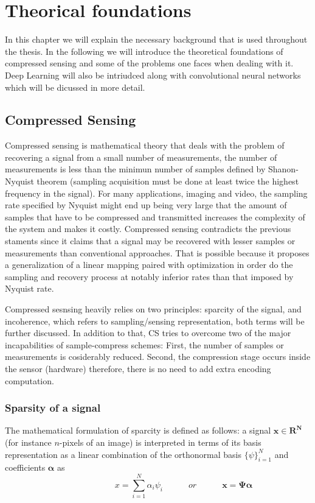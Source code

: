 \chapter{Theorical foundations}
In this chapter we will explain the necessary background that is used throughout the thesis. In the following we will introduce the theoretical foundations of compressed sensing and some of the problems one faces when dealing with it. Deep Learning will also be intriudced along with convolutional neural networks which will be dicussed in more detail.  

\section{Compressed Sensing}

Compressed sensing is mathematical theory that deals with the problem of recovering a signal from a small number of measurements, the number of measurements is less than the minimun number of samples defined by Shanon-Nyquist theorem (sampling acquisition must be done at least twice the highest frequency in the signal). For many applications, imaging and video, the sampling rate specified by Nyquist might end up being very large that the amount of samples that have to be compressed and transmitted increases the complexity of the system and makes it costly. Compressed sensing contradicts the previous staments since it claims that a signal may be recovered with lesser samples or measurements than conventional approaches. That is possible because it proposes a generalization of a linear mapping paired with optimization in order do the sampling and recovery process at notably inferior rates than that imposed by Nyquist rate. \

Compressed sesnsing heavily relies on two principles: sparcity of the signal, and incoherence, which refers to sampling/sensing representation, both terms will be further discussed. In addition to that, CS tries to overcome two of the major incapabilities of sample-compress schemes: First, the number of samples or measurements is cosiderably reduced. Second, the compression stage occurs inside the sensor (hardware) therefore, there is no need to add extra encoding computation.

\subsection{Sparsity of a signal}
The mathematical formulation of sparcity is defined as follows: a signal $\mathbf{x \in R^N}$ (for instance $n$-pixels of an image) is interpreted in terms of its basis representation as a linear combination of the orthonormal basis $\{\psi\}_{i=1}^{N}$ and coefficients $\mathbf{\alpha}$ as  
\begin{equation} \label{eq:signal}
\hspace{3em} \hspace{3em} x = \sum\limits_{i=1}^N \alpha_{i} \psi_{i} \hspace{3em} or \hspace{3em} \mathbf{x = \Psi \alpha}
\end{equation} 

